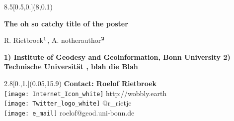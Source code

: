 \documentclass[portrait,a0,final]{a0poster}
\makeatletter
\newcommand{\ititle}{The oh so catchy title of the poster}
\newcommand{\iauthor}{Roelof Rietbroek}
\newcommand{\iemail}{roelof@geod.uni-bonn.de}
\newcommand{\itweet}{@r\_rietje}
\newcommand{\iblog}{http://wobbly.earth}
\makeatother
\begin{document}




\begin{textblock}{8.5}[0.5,0.](8,0.1)
\begin{center}
{
    {\Huge \color{white} \sffamily \textbf{\ititle}\\[0.7cm]}

    {\color{unigrau} \huge \sffamily
R. Rietbroek$^{\footnotesize\textbf{1}}$,
    A. notherauthor$^{\footnotesize\textbf{2}}$}\\[0.5cm]}

    {\color{unigrau} \large \sffamily \textbf{1) Institute of Geodesy and
    Geoinformation, Bonn University 
    2) Technische Universit\"at , blah die Blah\\}}

\end{center}
\end{textblock}





\begin{textblock}{2.8}[0.,1.](0.05,15.9)
{\large \sffamily \color{white}
  \noindent \textbf{Contact: \iauthor}\\
\texttt{[image: Internet\_Icon\_white]} \iblog\\
\texttt{[image: Twitter\_logo\_white]} \itweet\\ 
\texttt{[image: e\_mail]} \iemail
}\end{textblock}
\end{document}
